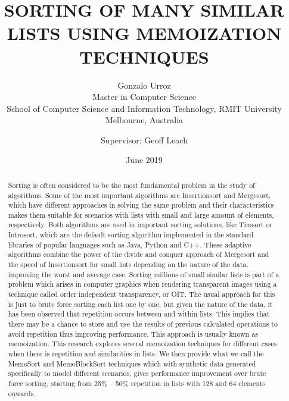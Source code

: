 \documentclass[a4paper,12pt]{article}
\begin{document}
\title{\uppercase{Sorting of many similar lists using memoization techniques}} 
\author{Gonzalo Urroz\\
{\small Master in Computer Science }\\
{\small School of Computer Science and Information Technology, RMIT University } \\
{\small Melbourne, Australia }\\
\and Supervisor: Geoff Leach
}

\date{June 2019}
\maketitle

\begin{abstract}
Sorting is often considered to be the most fundamental problem in the study of algorithms. Some of the most important algorithms are Insertionsort and Mergesort, which have different approaches in solving the same problem and their characteristics makes them suitable for scenarios with lists with small and large amount of elements, respectively. Both algorithms are used in important sorting solutions, like Timsort or Introsort, which are the default sorting algorithm implemented in the standard libraries of popular languages such as Java, Python and C++. These adaptive algorithms combine the power of the divide and conquer approach of Mergesort and the speed of Insertionsort for small lists depending on the nature of the data, improving the worst and average case.
Sorting millions of small similar lists is part of a problem which arises in computer graphics when rendering transparent images using a technique called order independent transparency, or OIT. The usual approach for this is just to brute force sorting each list one by one, but given the nature of the data, it has been observed that repetition occurs between and within lists. This implies that there may be a chance to store and use the results of previous calculated operations to avoid repetition thus improving performance. This approach is usually known as memoization. 
This research explores several memoization techniques for different cases when there is repetition and similarities in lists. We then provide what we call the MemoSort and MemoBlockSort techniques which with synthetic data generated specifically to model different scenarios, gives performance improvement over brute force sorting, starting from 25\% -- 50\% repetition in lists with 128 and 64 elements onwards.

\end{abstract}
\end{document}
